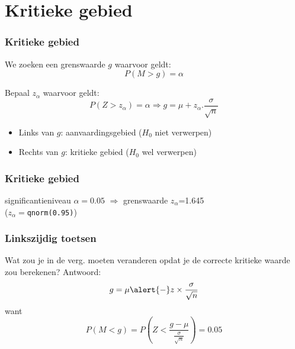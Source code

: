 \documentclass[aspectratio=169]{beamer}
\begin{document}
\section{Kritieke gebied}

\begin{frame}
  \frametitle{Kritieke gebied}
  
  \bigskip
  
  
  We zoeken een grenswaarde $g$ waarvoor geldt:
  \[ P(M > g) = \alpha \]

  Bepaal $z_\alpha$ waarvoor geldt:
  \[ P(Z > z_\alpha) = \alpha \Rightarrow g = \mu + z_\alpha . \frac{\sigma}{\sqrt{n}} \]
  
  \begin{itemize}
    \item Links van $g$: aanvaardingsgebied ($H_0$ niet verwerpen)
    \item Rechts van $g$: kritieke gebied ($H_0$ wel verwerpen)
  \end{itemize}
  
\end{frame}


\begin{frame}
  \frametitle{Kritieke gebied}

  \centering

significantieniveau $\alpha = 0.05$ $\Rightarrow$ grenswaarde $z_{\alpha}$=1.645\\
($z_{\alpha} = $\texttt{qnorm(0.95)})
  
\end{frame}

\begin{frame}
  \frametitle{Linkszijdig toetsen}
  
  Wat zou je in de verg.  moeten veranderen opdat je de correcte kritieke waarde zou berekenen?
  \pause
  Antwoord:
  \[g = \mu \alert{-} z \times \frac{\sigma}{\sqrt{n}} \]
  want
  \[ P(M < g) = P\left(Z < \frac{g - \mu}{\frac{\sigma}{\sqrt{n}}}\right) = 0.05 \]
  
\end{frame}
\end{document}
